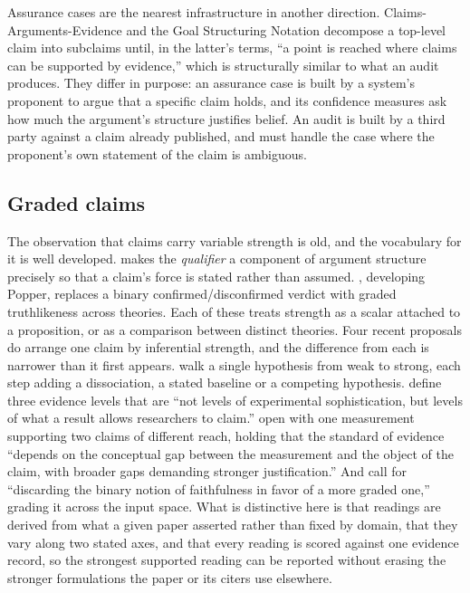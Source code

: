 \documentclass{article}
\begin{document}
Assurance cases are the nearest infrastructure in another direction. Claims-Arguments-Evidence \citep{bloomfield2014cae} and the Goal Structuring Notation \citep{kelly2004gsn} decompose a top-level claim into subclaims until, in the latter's terms, ``a point is reached where claims can be supported by evidence,'' which is structurally similar to what an audit produces. They differ in purpose: an assurance case is built by a system's proponent to argue that a specific claim holds, and its confidence measures ask how much the argument's structure justifies belief. An audit is built by a third party against a claim already published, and must handle the case where the proponent's own statement of the claim is ambiguous.

\subsection{Graded claims}
\label{sec:related-readings}

The observation that claims carry variable strength is old, and the vocabulary for it is well developed. \citet{toulmin1958uses} makes the \emph{qualifier} a component of argument structure precisely so that a claim's force is stated rather than assumed. \citet{niiniluoto1987truthlikeness}, developing Popper, replaces a binary confirmed/disconfirmed verdict with graded truthlikeness across theories. Each of these treats strength as a scalar attached to a proposition, or as a comparison between distinct theories. Four recent proposals do arrange one claim by inferential strength, and the difference from each is narrower than it first appears. \citet{leavitt2020falsifiable} walk a single hypothesis from weak to strong, each step adding a dissociation, a stated baseline or a competing hypothesis. \citet{gupta2026anthropomorphic} define three evidence levels that are ``not levels of experimental sophistication, but levels of what a result allows researchers to claim.'' \citet{salaudeen2025measurement} open with one measurement supporting two claims of different reach, holding that the standard of evidence ``depends on the conceptual gap between the measurement and the object of the claim, with broader gaps demanding stronger justification.'' And \citet{jacovi2020faithfully} call for ``discarding the binary notion of faithfulness in favor of a more graded one,'' grading it across the input space. What is distinctive here is that readings are derived from what a given paper asserted rather than fixed by domain, that they vary along two stated axes, and that every reading is scored against one evidence record, so the strongest supported reading can be reported without erasing the stronger formulations the paper or its citers use elsewhere.
\end{document}
